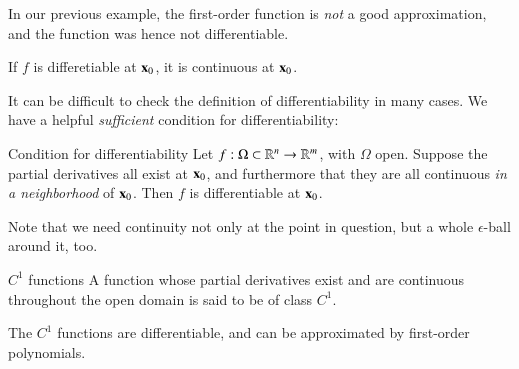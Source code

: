 In our previous example, the first-order function is \emph{not} a good approximation, and the function was hence not differentiable.

\begin{myTheorem}{}{}
    If $f$ is differetiable at $\mathbf{x}_0$, it is continuous at $\mathbf{x}_0$.
\end{myTheorem}

It can be difficult to check the definition of differentiability in many cases. We have a helpful \emph{sufficient} condition for differentiability:
\begin{myTheorem}{Condition for differentiability}{}
    Let $f : \Omega \subset \mathbb{R}^n \to \mathbb{R}^m$, with $\Omega$ open. Suppose the partial derivatives all exist at $\mathbf{x}_0$, and furthermore that they are all continuous \emph{in a neighborhood} of $\mathbf{x}_0$. Then $f$ is differentiable at $\mathbf{x}_0$.
\end{myTheorem}

Note that we need continuity not only at the point in question, but a whole $\epsilon$-ball around it, too.

\begin{myDefinition}{$C^1$ functions}{}
        A function whose partial derivatives exist and are continuous throughout the open domain is said to be of class $C^1$.
\end{myDefinition}

The $C^1$ functions are differentiable, and can be  approximated by first-order polynomials.

